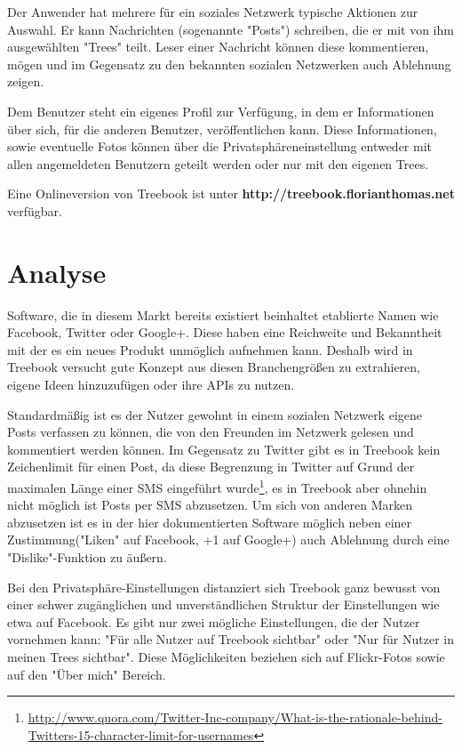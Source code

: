 \documentclass[10pt,a4paper]{book}
\begin{document}
Der Anwender hat mehrere für ein soziales Netzwerk typische Aktionen zur Auswahl. Er kann Nachrichten (sogenannte "Posts") schreiben, die er 
mit von ihm ausgewählten "Trees" teilt. Leser einer Nachricht können diese kommentieren, mögen und im Gegensatz zu den bekannten sozialen 
Netzwerken auch Ablehnung zeigen.

Dem Benutzer steht ein eigenes Profil zur Verfügung, in dem er Informationen über sich, für die anderen Benutzer, veröffentlichen kann. Diese 
Informationen, sowie eventuelle Fotos können über die Privatsphäreneinstellung entweder mit allen angemeldeten Benutzern geteilt werden oder 
nur mit den eigenen Trees.

Eine Onlineversion von Treebook ist unter \textbf{http://treebook.florianthomas.net} verfügbar.
\chapter{Analyse}
Software, die in diesem Markt bereits existiert beinhaltet etablierte Namen wie Facebook, Twitter oder Google+. Diese haben eine Reichweite und Bekanntheit mit der es ein neues Produkt unmöglich aufnehmen kann. Deshalb wird in Treebook versucht gute Konzept aus diesen Branchengrößen zu extrahieren, eigene Ideen hinzuzufügen oder ihre APIs zu nutzen.

Standardmäßig ist es der Nutzer gewohnt in einem sozialen Netzwerk eigene Posts verfassen zu können, die von den Freunden im Netzwerk gelesen und kommentiert werden können. Im Gegensatz zu Twitter gibt es in Treebook kein Zeichenlimit für einen Post, da diese Begrenzung in Twitter auf Grund der maximalen Länge einer SMS eingeführt wurde\footnote{\href{http://www.quora.com/Twitter-Inc-company/What-is-the-rationale-behind-Twitters-15-character-limit-for-usernames}{http://www.quora.com/Twitter-Inc-company/What-is-the-rationale-behind-Twitters-15-character-limit-for-usernames}}, es in Treebook aber ohnehin nicht möglich ist Posts per SMS abzusetzen.
Um sich von anderen Marken abzusetzen ist es in der hier dokumentierten Software möglich neben einer Zustimmung("Liken" auf Facebook, +1 auf Google+) auch Ablehnung durch eine "Dislike"-Funktion zu äußern.

Bei den Privatsphäre-Einstellungen distanziert sich Treebook ganz bewusst von einer schwer zugänglichen und unverständlichen Struktur der Einstellungen wie etwa auf Facebook. Es gibt nur zwei mögliche Einstellungen, die der Nutzer vornehmen kann: "Für alle Nutzer auf Treebook sichtbar" oder "Nur für Nutzer in meinen Trees sichtbar". Diese Möglichkeiten beziehen sich auf Flickr-Fotos sowie auf den "Über mich" Bereich.
\end{document}
